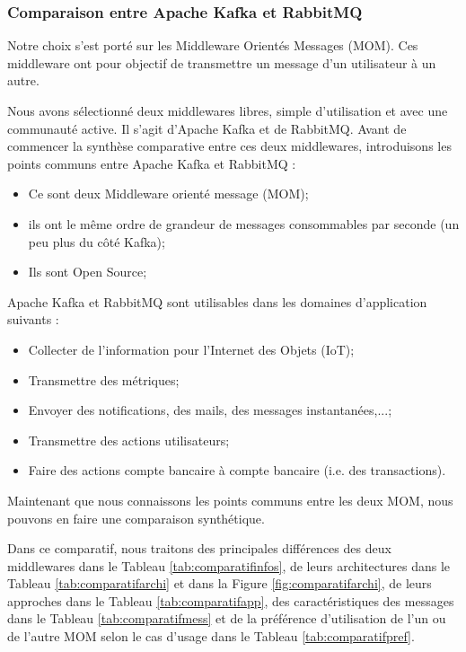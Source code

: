 \documentclass{article}
\begin{document}
		\subsubsection{Comparaison entre Apache Kafka et RabbitMQ}\label{sec:comparatif}
			Notre choix s'est porté sur les Middleware Orientés Messages (MOM).
			Ces middleware ont pour objectif de transmettre un message d'un utilisateur à un autre.\par
			Nous avons sélectionné deux middlewares libres, simple d'utilisation et avec une communauté active.
			Il s'agit d'Apache Kafka et de RabbitMQ.
			Avant de commencer la synthèse comparative entre ces deux middlewares,  introduisons les points communs entre Apache Kafka et RabbitMQ :
			\begin{itemize}
				\item Ce sont deux Middleware orienté message (MOM);
				\item ils ont le même ordre de grandeur de messages consommables par seconde (un peu plus du côté Kafka);
				\item Ils sont Open Source;
			\end{itemize}
			Apache Kafka et RabbitMQ sont utilisables dans les domaines d'application suivants :
			\begin{itemize}
				\item Collecter de l’information pour l'Internet des Objets (IoT);
				\item Transmettre des métriques;
				\item Envoyer des notifications, des mails, des messages instantanées,...;
				\item Transmettre des actions utilisateurs;
				\item Faire des actions compte bancaire à compte bancaire (i.e. des transactions).
			\end{itemize}\par
			Maintenant que nous connaissons les points communs entre les deux MOM, nous pouvons en faire une comparaison synthétique.\par
			Dans ce comparatif, nous traitons des principales différences des deux middlewares dans le Tableau \ref{tab:comparatifinfos}, de leurs architectures dans le Tableau \ref{tab:comparatifarchi} et dans la Figure \ref{fig:comparatifarchi}, de leurs approches dans le Tableau \ref{tab:comparatifapp}, des caractéristiques des messages dans le Tableau \ref{tab:comparatifmess} et de la préférence d'utilisation de l'un ou de l'autre MOM selon le cas d'usage dans le Tableau \ref{tab:comparatifpref}.\par
\end{document}
